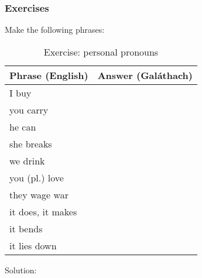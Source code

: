 \newpage
\subsubsection{Exercises}

Make the following phrases:\\
\begin{table}[H]
\centering
\begin{tabular}{|l|M{10.0cm}|}
  \toprule
  \textbf{Phrase (English)} & \textbf{Answer (Gal\'{a}thach)}\\
  \toprule
  I buy & \\
  \midrule
  you carry & \\
  \midrule
  he can & \\
  \midrule
  she breaks & \\
  \midrule
  we drink & \\
  \midrule
  you (pl.) love & \\
  \midrule
  they wage war & \\
  \midrule
  it does, it makes & \\
  \midrule
  it bends & \\
  \midrule
  it lies down & \\
  \bottomrule
\end{tabular}
\label{exercise_personal_pronouns}
\caption{Exercise: personal pronouns}
\end{table}

\newpage
Solution:
\begin{table}[H]
\centering
{}
\label{solution_phrases}
\caption{Solution: phrases}
\end{table}
